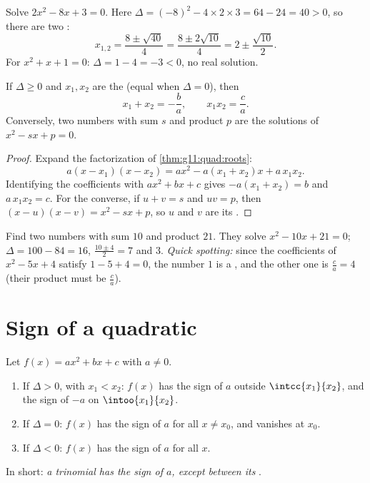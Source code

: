 \begin{example}\label{ex:g11:quad:solving}
Solve $2x^2 - 8x + 3 = 0$. Here $\Delta = (-8)^2 - 4 \times 2 \times 3 =
64 - 24 = 40 > 0$, so there are two :
\[
x_{1,2} = \frac{8 \pm \sqrt{40}}{4} = \frac{8 \pm 2\sqrt{10}}{4}
= 2 \pm \frac{\sqrt{10}}{2}.
\]
For $x^2 + x + 1 = 0$: $\Delta = 1 - 4 = -3 < 0$, no real solution.
\end{example}

\begin{proposition}\label{prop:g11:quad:vieta}
If $\Delta \geq 0$ and $x_1, x_2$ are the  (equal when $\Delta = 0$),
then
\[
x_1 + x_2 = -\frac{b}{a},
\qquad
x_1 x_2 = \frac{c}{a} .
\]
Conversely, two numbers with sum $s$ and product $p$ are the solutions of
$x^2 - sx + p = 0$.
\end{proposition}

\begin{proof}
Expand the factorization of \cref{thm:g11:quad:roots}:
\[
a(x - x_1)(x - x_2) = a x^2 - a(x_1 + x_2)x + a\,x_1 x_2 .
\]
Identifying the coefficients with $ax^2 + bx + c$ gives
$-a(x_1+x_2) = b$ and $a\,x_1x_2 = c$. For the converse, if $u + v = s$ and
$uv = p$, then $(x-u)(x-v) = x^2 - sx + p$, so $u$ and $v$ are its .
\end{proof}

\begin{example}
Find two numbers with sum $10$ and product $21$. They solve
$x^2 - 10x + 21 = 0$; $\Delta = 100 - 84 = 16$, 
$\frac{10 \pm 4}{2} = 7$ and $3$. \emph{Quick  spotting:} since the
coefficients of $x^2 - 5x + 4$ satisfy $1 - 5 + 4 = 0$, the number $1$ is a
, and the other one is $\frac{c}{a} = 4$ (their product must be
$\frac ca$).
\end{example}

\section{Sign of a quadratic}

\begin{theorem}\label{thm:g11:quad:sign}
Let $f(x) = ax^2+bx+c$ with $a \neq 0$.
\begin{enumerate}
  \item If $\Delta > 0$, with  $x_1 < x_2$: $f(x)$ has the sign of $a$
        outside $\intcc{x_1}{x_2}$, and the sign of $-a$ on
        $\intoo{x_1}{x_2}$.
  \item If $\Delta = 0$: $f(x)$ has the sign of $a$ for all $x \neq x_0$,
        and vanishes at $x_0$.
  \item If $\Delta < 0$: $f(x)$ has the sign of $a$ for all $x$.
\end{enumerate}
In short: \emph{a trinomial has the sign of $a$, except between its }.
\end{theorem}

